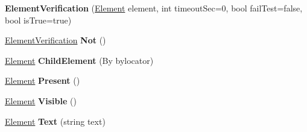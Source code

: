 \begin{DoxyCompactItemize}
\item 
\hypertarget{class_proto_test_1_1_golem_1_1_web_driver_1_1_element_verification_a04ebf2bbd0533d58b5bd8d12e2a50744}{{\bfseries Element\-Verification} (\hyperlink{class_proto_test_1_1_golem_1_1_web_driver_1_1_element}{Element} element, int timeout\-Sec=0, bool fail\-Test=false, bool is\-True=true)}\label{class_proto_test_1_1_golem_1_1_web_driver_1_1_element_verification_a04ebf2bbd0533d58b5bd8d12e2a50744}

\item 
\hypertarget{class_proto_test_1_1_golem_1_1_web_driver_1_1_element_verification_a7edbe64a0c90795564f1dc2154424f2d}{\hyperlink{class_proto_test_1_1_golem_1_1_web_driver_1_1_element_verification}{Element\-Verification} {\bfseries Not} ()}\label{class_proto_test_1_1_golem_1_1_web_driver_1_1_element_verification_a7edbe64a0c90795564f1dc2154424f2d}

\item 
\hypertarget{class_proto_test_1_1_golem_1_1_web_driver_1_1_element_verification_a4e752555dbcfa683ce79bcc4f00e0cdb}{\hyperlink{class_proto_test_1_1_golem_1_1_web_driver_1_1_element}{Element} {\bfseries Child\-Element} (By bylocator)}\label{class_proto_test_1_1_golem_1_1_web_driver_1_1_element_verification_a4e752555dbcfa683ce79bcc4f00e0cdb}

\item 
\hypertarget{class_proto_test_1_1_golem_1_1_web_driver_1_1_element_verification_a5d6418282281b17cd87f1ac128842e61}{\hyperlink{class_proto_test_1_1_golem_1_1_web_driver_1_1_element}{Element} {\bfseries Present} ()}\label{class_proto_test_1_1_golem_1_1_web_driver_1_1_element_verification_a5d6418282281b17cd87f1ac128842e61}

\item 
\hypertarget{class_proto_test_1_1_golem_1_1_web_driver_1_1_element_verification_addfb4b1b95556fdb9ca479e85142a18c}{\hyperlink{class_proto_test_1_1_golem_1_1_web_driver_1_1_element}{Element} {\bfseries Visible} ()}\label{class_proto_test_1_1_golem_1_1_web_driver_1_1_element_verification_addfb4b1b95556fdb9ca479e85142a18c}

\item 
\hypertarget{class_proto_test_1_1_golem_1_1_web_driver_1_1_element_verification_aa2714ecd2df00ed53e24f3523285e0d2}{\hyperlink{class_proto_test_1_1_golem_1_1_web_driver_1_1_element}{Element} {\bfseries Text} (string text)}\label{class_proto_test_1_1_golem_1_1_web_driver_1_1_element_verification_aa2714ecd2df00ed53e24f3523285e0d2}


\end{DoxyCompactItemize}
